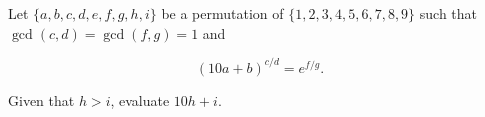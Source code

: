 Let $\{a,b,c,d,e,f,g,h,i\}$ be a permutation of $\{1,2,3,4,5,6,7,8,9\}$ such that $\gcd(c,d)=\gcd(f,g)=1$ and

\[(10a+b)^{c/d}=e^{f/g}.\]

Given that $h>i$, evaluate $10h+i$.
